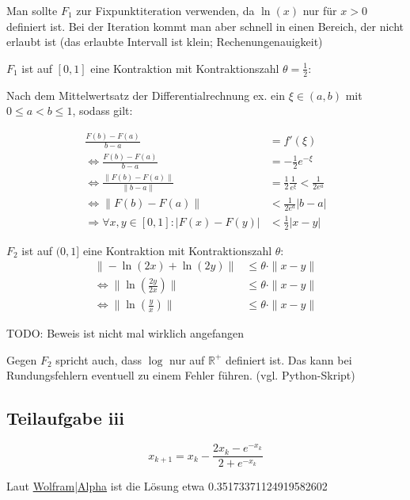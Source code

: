 Man sollte $F_1$ zur Fixpunktiteration verwenden, da $\ln(x)$ nur für
$x>0$ definiert ist. Bei der Iteration kommt man aber schnell in
einen Bereich, der nicht erlaubt ist (das erlaubte Intervall ist klein;
Rechenungenauigkeit)

$F_1$ ist auf $[0,1]$ eine Kontraktion mit Kontraktionszahl $\theta = \frac{1}{2}$:

Nach dem Mittelwertsatz der Differentialrechnung ex. ein $\xi \in (a,b)$ mit $ 0 \leq a < b \leq 1$, sodass 
gilt:


\begin{align}
    \frac{F(b) - F(a)}{b-a} &= f'(\xi) \\
    \Leftrightarrow \frac{F(b) - F(a)}{b-a} &= - \frac{1}{2} e^{- \xi} \\
    \Leftrightarrow \frac{\|F(b) - F(a)\|}{\|b-a\|} &= \frac{1}{2} \frac{1}{e^{\xi}} < \frac{1}{2 e^a} \\
    \Leftrightarrow \|F(b) - F(a)\| &< \frac{1}{2 e^a} |b-a|\\
    \Rightarrow \forall x, y \in [0,1]: |F(x) - F(y)| &< \frac{1}{2} |x-y|
\end{align}

$F_2$ ist auf $(0,1]$ eine Kontraktion mit Kontraktionszahl $\theta$:
\begin{align}
    \|- \ln (2x) + \ln(2y) \| &\leq \theta \cdot \|x-y\|\\
    \Leftrightarrow \| \ln(\frac{2y}{2x}) \| &\leq \theta \cdot \|x-y\|\\
    \Leftrightarrow \| \ln(\frac{y}{x}) \| &\leq \theta \cdot \|x-y\|
\end{align}

TODO: Beweis ist nicht mal wirklich angefangen

Gegen $F_2$ spricht auch, dass $\log$ nur auf $\mathbb{R}^+$ definiert
ist. Das kann bei Rundungsfehlern eventuell zu einem Fehler führen.
(vgl. Python-Skript)

\subsection*{Teilaufgabe iii}
\[x_{k+1} = x_k - \frac{2x_k - e^{-x_k}}{2 + e^{-x_k}}\]

Laut \href{http://www.wolframalpha.com/input/?i=2x-e%5E(-x)%3D0}{Wolfram|Alpha} ist die Lösung etwa 0.35173371124919582602
